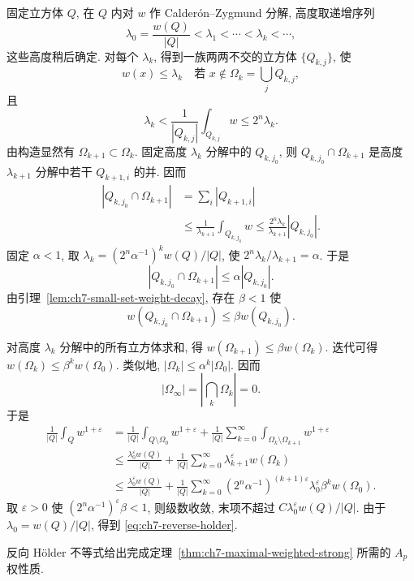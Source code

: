 \begin{Proof}
固定立方体 $Q$, 在 $Q$ 内对 $w$ 作 Calderón--Zygmund 分解, 高度取递增序列
\[
 \lambda_0=\frac{w(Q)}{|Q|}<\lambda_1<\cdots<\lambda_k<\cdots,
\]
这些高度稍后确定. 对每个 $\lambda_k$, 得到一族两两不交的立方体 $\{Q_{k,j}\}$, 使
\[
 w(x)\le\lambda_k\quad\text{若 }x\notin\Omega_k=\bigcup_jQ_{k,j},
\]
且
\[
 \lambda_k<\frac1{|Q_{k,j}|}\int_{Q_{k,j}}w\le2^n\lambda_k.
\]
由构造显然有 $\Omega_{k+1}\subset\Omega_k$. 固定高度 $\lambda_k$ 分解中的 $Q_{k,j_0}$, 则 $Q_{k,j_0}\cap\Omega_{k+1}$ 是高度 $\lambda_{k+1}$ 分解中若干 $Q_{k+1,i}$ 的并. 因而
\[
\begin{aligned}
 |Q_{k,j_0}\cap\Omega_{k+1}|
 &=\sum_i|Q_{k+1,i}|\\
 &\le\frac1{\lambda_{k+1}}\int_{Q_{k,j_0}}w
 \le\frac{2^n\lambda_k}{\lambda_{k+1}}|Q_{k,j_0}|.
\end{aligned}
\]
固定 $\alpha<1$, 取 $\lambda_k=(2^n\alpha^{-1})^kw(Q)/|Q|$, 使 $2^n\lambda_k/\lambda_{k+1}=\alpha$. 于是
\[
 |Q_{k,j_0}\cap\Omega_{k+1}|\le\alpha|Q_{k,j_0}|.
\]
由引理~\ref{lem:ch7-small-set-weight-decay}, 存在 $\beta<1$ 使
\[
 w(Q_{k,j_0}\cap\Omega_{k+1})\le\beta w(Q_{k,j_0}).
\]

\hypertarget{chapter-07-page-151}{}
对高度 $\lambda_k$ 分解中的所有立方体求和, 得 $w(\Omega_{k+1})\le\beta w(\Omega_k)$. 迭代可得 $w(\Omega_k)\le\beta^kw(\Omega_0)$. 类似地, $|\Omega_k|\le\alpha^k|\Omega_0|$. 因而
\[
 |\Omega_\infty|=\left|\bigcap_k\Omega_k\right|=0.
\]
于是
\[
\begin{aligned}
 \frac1{|Q|}\int_Qw^{1+\varepsilon}
 &=\frac1{|Q|}\int_{Q\setminus\Omega_0}w^{1+\varepsilon}
 +\frac1{|Q|}\sum_{k=0}^\infty
 \int_{\Omega_k\setminus\Omega_{k+1}}w^{1+\varepsilon}\\
 &\le\frac{\lambda_0^\varepsilon w(Q)}{|Q|}
 +\frac1{|Q|}\sum_{k=0}^\infty\lambda_{k+1}^\varepsilon w(\Omega_k)\\
 &\le\frac{\lambda_0^\varepsilon w(Q)}{|Q|}
 +\frac1{|Q|}\sum_{k=0}^\infty
 (2^n\alpha^{-1})^{(k+1)\varepsilon}\lambda_0^\varepsilon\beta^kw(\Omega_0).
\end{aligned}
\]
取 $\varepsilon>0$ 使 $(2^n\alpha^{-1})^\varepsilon\beta<1$, 则级数收敛, 末项不超过 $C\lambda_0^\varepsilon w(Q)/|Q|$. 由于 $\lambda_0=w(Q)/|Q|$, 得到 \eqref{eq:ch7-reverse-holder}.
\end{Proof}

反向 Hölder 不等式给出完成定理~\ref{thm:ch7-maximal-weighted-strong} 所需的 $A_p$ 权性质.


